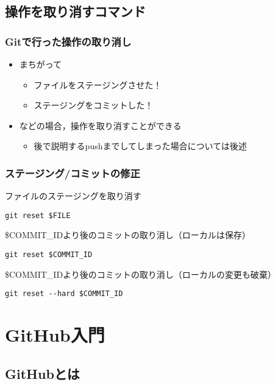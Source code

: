 \documentclass[a4paper,twoside,twocolumn]{bxjsarticle}
\begin{document}
\subsection{操作を取り消すコマンド}
\label{sec-1-7}
\subsubsection{Gitで行った操作の取り消し}
\label{sec-1-7-1}
\begin{itemize}
\item まちがって
\begin{itemize}
\item ファイルをステージングさせた！
\item ステージングをコミットした！
\end{itemize}
\item などの場合，操作を取り消すことができる
\begin{itemize}
\item 後で説明するpushまでしてしまった場合については後述
\end{itemize}
\end{itemize}

\subsubsection{ステージング/コミットの修正}
\label{sec-1-7-2}
ファイルのステージングを取り消す

\begin{verbatim}
git reset $FILE
\end{verbatim}

\$COMMIT\_IDより後のコミットの取り消し（ローカルは保存）

\begin{verbatim}
git reset $COMMIT_ID
\end{verbatim}

\$COMMIT\_IDより後のコミットの取り消し（ローカルの変更も破棄）

\begin{verbatim}
git reset --hard $COMMIT_ID
\end{verbatim}

\section{GitHub入門}
\label{sec-2}
\subsection{GitHubとは}
\label{sec-2-1}
\end{document}
